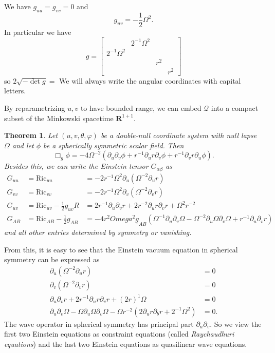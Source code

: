 \documentclass[12pt]{report}
\newcommand{\RR}{\mathbf{R}}
\newcommand{\Ric}{\text{Ric}}
\newcommand{\Q}{\mathcal Q}
\newcommand{\dfn}[1]{\emph{#1}\index{#1}}
\newtheorem{theorem}{Theorem}[chapter]
\theoremstyle{definition}
\theoremstyle{remark}
\begin{document}
    We have $g_{uu} = g_{vv} = 0$ and
    $$g_{uv} = - \frac{1}{2} \Omega^2.$$
In particular we have
$$g = \begin{bmatrix}
&2^{-1}\Omega^2\\
2^{-1}\Omega^2\\
&&r^2\\
&&&r^2\end{bmatrix}$$
so
$2\sqrt{-\det g} = $
    We will always write the angular coordinates with capital letters.
    
    By reparametrizing $u,v$ to have bounded range, we can embed $\Q$ into a compact subset of the Minkowski spacetime $\RR^{1+1}$.
\begin{theorem}
    Let $(u, v, \theta, \varphi)$ be a double-null coordinate system with null lapse $\Omega$ and let $\phi$ be a spherically symmetric scalar field. Then
    $$\Box_g \phi = -4 \Omega^{-2}(\partial_u \partial_v \phi + r^{-1}\partial_u r \partial_v \phi + r^{-1} \partial_v r \partial_u \phi).$$
    Besides this, we can write the Einstein tensor $G_{\alpha\beta}$ as
\begin{align*}
    G_{uu} &= \Ric_{uu} &= -2r^{-1} \Omega^2 \partial_u (\Omega^{-2} \partial_u r)\\
    G_{vv} &= \Ric_{vv} &= -2r^{-1} \Omega^2 \partial_v (\Omega^{-2} \partial_v r)\\
    G_{uv} &= \Ric_{uv} - \frac{1}{2} g_{uv}R &= 2r^{-1} \partial_u \partial_v r + 2r^{-2} \partial_u r \partial_v r + \Omega^2r^{-2}\\
    G_{AB} &= \Ric_{AB} - \frac{1}{2}g_{AB} &= -4r^2 Omega^2\underline g_{AB}(\Omega^{-1} \partial_u \partial_v \Omega - \Omega^{-2} \partial_u \Omega \partial_v \Omega + r^{-1} \partial_u \partial_v r)
\end{align*}
    and all other entries determined by symmetry or vanishing.
\end{theorem}
From this, it is easy to see that the Einstein vacuum equation in spherical symmetry can be expressed as
\begin{align*}
    \partial_u(\Omega^{-2}\partial_u r) &= 0\\
    \partial_v(\Omega^{-2}\partial_v r) &= 0\\
    \partial_u \partial_v r + 2r^{-1} \partial_u r \partial_v r + (2r)^{1} \Omega &= 0\\
    \partial_u \partial_v \Omega - \Omega \partial_u \Omega \partial_v \Omega - \Omega r^{-2}(2\partial_u r \partial_b r + 2^{-1}\Omega^2) &= 0.
\end{align*}
The wave operator in spherical symmetry has principal part $\partial_u \partial_v$. So we view the first two Einstein equations as constraint equations (called \dfn{Raychaudhuri equations}) and the last two Einstein equations as quasilinear wave equations.
\end{document}
